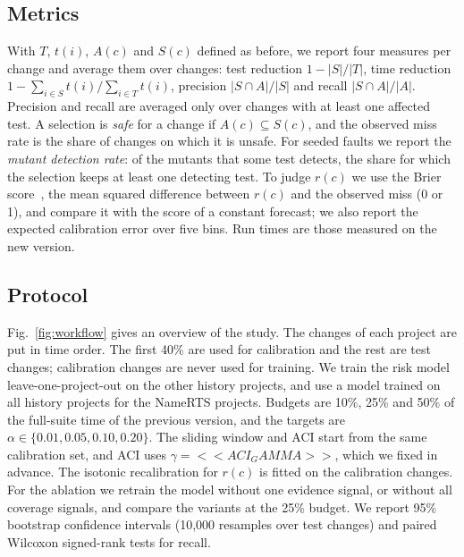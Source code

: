 \documentclass[conference]{IEEEtran}
\begin{document}
\subsection{Metrics}
With $T$, $t(i)$, $A(c)$ and $S(c)$ defined as before, we report four measures per change and average them over changes: test reduction $1-|S|/|T|$, time reduction $1-\sum_{i\in S}t(i)/\sum_{i\in T}t(i)$, precision $|S\cap A|/|S|$ and recall $|S\cap A|/|A|$. Precision and recall are averaged only over changes with at least one affected test. A selection is \textit{safe} for a change if $A(c)\subseteq S(c)$, and the observed miss rate is the share of changes on which it is unsafe. For seeded faults we report the \textit{mutant detection rate}: of the mutants that some test detects, the share for which the selection keeps at least one detecting test. To judge $r(c)$ we use the Brier score~\cite{brier1950verification}, the mean squared difference between $r(c)$ and the observed miss (0 or 1), and compare it with the score of a constant forecast; we also report the expected calibration error over five bins. Run times are those measured on the new version.

\subsection{Protocol}
Fig.~\ref{fig:workflow} gives an overview of the study. The changes of each project are put in time order. The first 40\% are used for calibration and the rest are test changes; calibration changes are never used for training. We train the risk model leave-one-project-out on the other history projects, and use a model trained on all history projects for the NameRTS projects. Budgets are 10\%, 25\% and 50\% of the full-suite time of the previous version, and the targets are $\alpha\in\{0.01,0.05,0.10,0.20\}$. The sliding window and ACI start from the same calibration set, and ACI uses $\gamma=<<ACI_GAMMA>>$, which we fixed in advance. The isotonic recalibration for $r(c)$ is fitted on the calibration changes. For the ablation we retrain the model without one evidence signal, or without all coverage signals, and compare the variants at the 25\% budget. We report 95\% bootstrap confidence intervals (10,000 resamples over test changes) and paired Wilcoxon signed-rank tests for recall.

\end{document}
